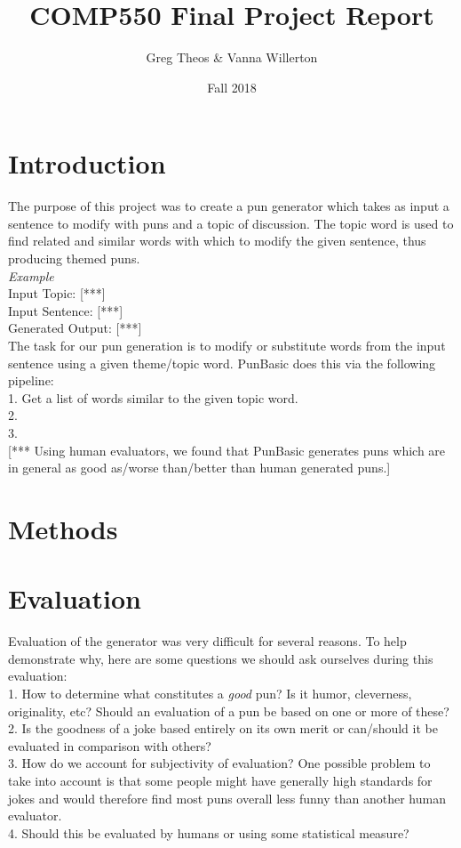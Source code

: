 \documentclass{article}
\title{COMP550 Final Project Report}
\author{Greg Theos & Vanna Willerton}
\date{Fall 2018}
\begin{document}
\maketitle

\section{Introduction}

The purpose of this project was to create a pun generator which takes as input a sentence to modify with puns and a topic of discussion. The topic word is used to find related and similar words with which to modify the given sentence, thus producing themed puns. \\

\textit{Example}\\
Input Topic: [***] \\
Input Sentence: [***] \\
Generated Output: [***] \\

The task for our pun generation is to modify or substitute words from the input sentence using a given theme/topic word. PunBasic does this via the following pipeline:\\
1. Get a list of words similar to the given topic word.\\
2. \\
3. \\

[*** Using human evaluators, we found that PunBasic generates puns which are in general as good as/worse than/better than human generated puns.]
\section{Methods}

\section{Evaluation}

Evaluation of the generator was very difficult for several reasons. To help demonstrate why, here are some questions we should ask ourselves during this evaluation: \\
1. How to determine what constitutes a \textit{good} pun? Is it humor, cleverness, originality, etc? Should an evaluation of a pun be based on one or more of these?\\
2. Is the goodness of a joke based entirely on its own merit or can/should it be evaluated in comparison with others?\\
3. How do we account for subjectivity of evaluation? One possible problem to take into account is that some people might have generally high standards for jokes and would therefore find most puns overall less funny than another human evaluator.\\
4. Should this be evaluated by humans or using some statistical measure?\\
\end{document}
